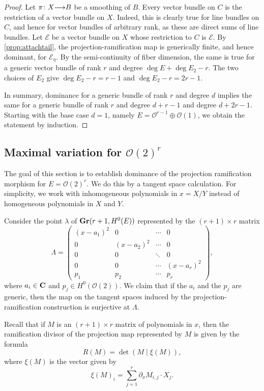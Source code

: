 \documentclass[11pt,reqno]{amsart}
\theoremstyle{plain}
\theoremstyle{definition}
\theoremstyle{remark}
\numberwithin{equation}{section}
\renewcommand{\to}{{\longrightarrow}}
\numberwithin{equation}{section}
\renewcommand{\O}{\mathcal O}
\begin{document}
\begin{proof}
  Let $\pi \from X \to B$ be a smoothing of $B$.
  Every vector bundle on $C$ is the restriction of a vector bundle on $X$.
  Indeed, this is clearly true for line bundles on $C$, and hence for vector bundles of arbitrary rank, as these are direct sums of line bundles. 
  Let $\mathscr E$ be a vector bundle on $X$ whose restriction to $C$ is $\mathcal E$.
  By \autoref{prop:attachtail}, the projection-ramification map is generically finite, and hence dominant, for $\mathcal E_\eta$.
  By the semi-continuity of fiber dimension, the same is true for a generic vector bundle of rank $r$ and degree $\deg E + \deg E_2 - r $.
  The two choices of $E_2$ give $\deg E_2 - r = r-1$ and $\deg E_2 - r = 2r-1$.

  In summary, dominance for a generic bundle of rank $r$ and degree $d$ implies the same for a generic bundle of rank $r$ and degree $d+r-1$ and degree $d+2r-1$.
  Starting with the base case $d = 1$, namely $E = \O^{r-1} \oplus \O(1)$, we obtain the statement by induction.
\end{proof}



\subsection{Maximal variation for $\O(2)^r$}
The goal of this section is to establish dominance of the projection ramification morphism for $E = \O(2)^r$.
We do this by a tangent space calculation.
For simplicity, we work with inhomogeneous polynomials in $x = X/Y$ instead of homogeneous polynomials in $X$ and $Y$.

Consider the point $\lambda$ of ${\bf Gr}(r+1, H^0(E))$ represented by the $(r+1) \times r$ matrix
\[
  \Lambda =
  \begin{pmatrix}
    (x-a_1)^2 & 0 &  \cdots & 0 \\
    0 & (x-a_2)^2 & \cdots & 0\\
    0 & 0 & \ddots & 0 \\
    0 & 0 & \cdots & (x-a_r)^2\\
    p_1 & p_2 & \cdots & p_r
  \end{pmatrix},
\]
where $a_i \in {\bf C}$ and $p_j \in H^0(\O(2))$.
We claim that if the $a_i$ and the $p_j$ are generic, then the map on the tangent spaces induced by the projection-ramification construction is surjective at $\Lambda$.

Recall that if $M$ is an $(r+1) \times r$ matrix of polynomials in $x$, then the ramification divisor of the projection map represented by $M$ is given by the formula
\[
  R(M)  = \det \left(M \mid \xi(M)\right),
\]
where $\xi(M)$ is the vector given by
\[
  \xi(M)_i = \sum_{j = 1}^r \partial_x M_{i,j} \cdot X_j.
\]
\end{document}
